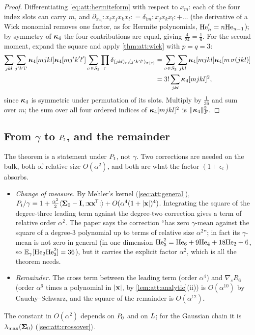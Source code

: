 \begin{proof}
Differentiating \cref{eq:att:hermiteform} with respect to $x_m$: each of the four
index slots can carry $m$, and $\partial_{x_m}{:}x_ix_jx_kx_l{:}=\delta_{im}{:}x_jx_kx_l{:}+\dots$
(the derivative of a Wick monomial removes one factor, as for Hermite polynomials,
$\mathrm{He}_{n}'=n\mathrm{He}_{n-1}$); by symmetry of $\bm{\kappa}_4$ the four contributions are equal,
giving $\tfrac4{24}=\tfrac16$. For the second moment, expand the square and apply
\cref{thm:att:wick} with $p=q=3$:
\begin{align*}
  \sum_{jkl}\sum_{j'k'l'}\bm{\kappa}_4[mjkl]\bm{\kappa}_4[mj'k'l']\sum_{\sigma\in S_3}\prod_r\delta_{(jkl)_r,(j'k'l')_{\sigma(r)}}
  &=\sum_{\sigma\in S_3}\sum_{jkl}\bm{\kappa}_4[mjkl]\bm{\kappa}_4[m\,\sigma(jkl)]\\
  &=3!\sum_{jkl}\bm{\kappa}_4[mjkl]^2,
\end{align*}
since $\bm{\kappa}_4$ is symmetric under permutation of its slots. Multiply by $\tfrac1{36}$
and sum over $m$; the sum over all four ordered indices of $\bm{\kappa}_4[mjkl]^2$ is
$\lVert \bm{\kappa}_4 \rVert_{F}^2$.
\end{proof}

\subsection{From $\gamma$ to $P_t$, and the remainder}

The theorem is a statement under $P_t$, not $\gamma$. Two corrections are needed on
the bulk, both of relative size $O(\alpha^2)$, and both are what the factor
$(1+\epsilon_t)$ absorbs.
\begin{itemize}
\item \emph{Change of measure.} By Mehler's kernel (\cref{sec:att:general}),
  $P_t/\gamma=1+\tfrac{\alpha^2}2\langle\mathbf{\Sigma}_0-\mathbf{I},{:}\mathbf{x}\mathbf{x}^{\!\top}{:}\rangle+O(\alpha^4(1+|\mathbf{x}|)^4)$.
  Integrating the square of the degree-three leading term against the degree-two
  correction gives a term of relative order $\alpha^2$. The paper says the correction
  ``has zero $\gamma$-mean against the square of a degree-3 polynomial up to terms of
  relative size $\alpha^2$''; in fact its $\gamma$-mean is not zero in general (in one
  dimension $\mathrm{He}_{3}^2=\mathrm{He}_{6}+9\mathrm{He}_{4}+18\mathrm{He}_{2}+6$, so $\mathbb{E}_\gamma[\mathrm{He}_{2}\mathrm{He}_{3}^2]=36$), but
  it carries the explicit factor $\alpha^2$, which is all the theorem needs.
\item \emph{Remainder.} The cross term between the leading term (order $\alpha^4$) and
  $\nabla_sR_6$ (order $\alpha^6$ times a polynomial in $|\mathbf{x}|$, by
  \cref{lem:att:analytic}(ii)) is $O(\alpha^{10})$ by Cauchy--Schwarz, and the square of
  the remainder is $O(\alpha^{12})$.
\end{itemize}
The constant in $O(\alpha^2)$ depends on $P_0$ and on $L$; for the Gaussian chain
it is $\lambda_{\max}(\mathbf{\Sigma}_0)$ (\cref{sec:att:crossover}).

